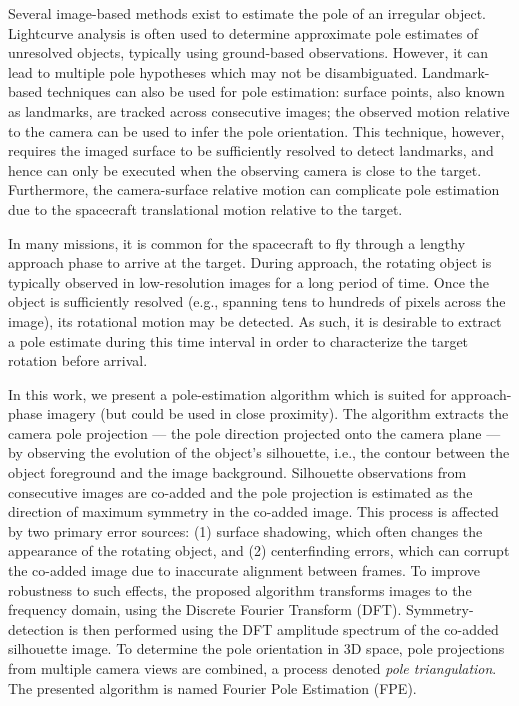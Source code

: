 Several image-based methods exist to estimate the pole of an irregular object. Lightcurve analysis is often used to determine approximate pole estimates of unresolved objects, typically using ground-based observations\cite{kaasalainen2001optimization}. However, it can lead to multiple pole hypotheses which may not be disambiguated. Landmark-based techniques can also be used for pole estimation: surface points, also known as landmarks, are tracked across consecutive images; the observed motion relative to the camera can be used to infer the pole orientation\cite{panicucci2023vision}. This technique, however, requires the imaged surface to be sufficiently resolved to detect landmarks, and hence can only be executed when the observing camera is close to the target. Furthermore, the camera-surface relative motion can complicate pole estimation due to the spacecraft translational motion relative to the target.

In many missions, it is common for the spacecraft to fly through a lengthy approach phase to arrive at the target. During approach, the rotating object is typically observed in low-resolution images for a long period of time. Once the object is sufficiently resolved (e.g., spanning tens to hundreds of pixels across the image), its rotational motion may be detected. As such, it is desirable to extract a pole estimate during this time interval in order to characterize the target rotation before arrival.

In this work, we present a pole-estimation algorithm which is suited for approach-phase imagery (but could be used in close proximity). The algorithm extracts the camera pole projection --- the pole direction projected onto the camera plane --- by observing the evolution of the object's silhouette, i.e., the contour between the object foreground and the image background. Silhouette observations from consecutive images are co-added and the pole projection is estimated as the direction of maximum symmetry in the co-added image. This process is affected by two primary error sources: (1) surface shadowing, which often changes the appearance of the rotating object, and (2) centerfinding errors, which can corrupt the co-added image due to inaccurate alignment between frames. To improve robustness to such effects, the proposed algorithm transforms images to the frequency domain, using the Discrete Fourier Transform (DFT). Symmetry-detection is then performed using the DFT amplitude spectrum of the co-added silhouette image. To determine the pole orientation in 3D space, pole projections from multiple camera views are combined, a process denoted \textit{pole triangulation}. The presented algorithm is named Fourier Pole Estimation (FPE).

